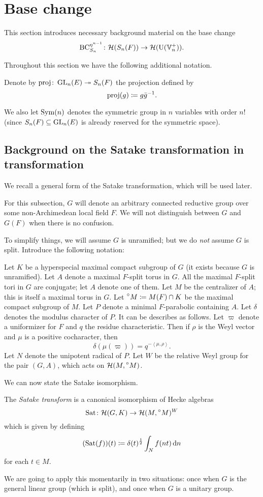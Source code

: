\chapter{Base change}
\label{ch:satake}

This section introduces necessary background material on the base change
\[ \operatorname{BC}_{S_n}^{\eta^{n-1}} \colon \mathcal H(S_n(F)) \to \mathcal H(\operatorname{U}(\mathbb V_n^+)). \]

Throughout this section we have the following additional notation.
\begin{definition}
  Denote by $\operatorname{proj} \colon \operatorname{GL}_n(E) \twoheadrightarrow S_n(F)$ the projection defined by
  \[ \operatorname{proj}(g) \coloneqq g \bar{g}^{-1}. \]
\end{definition}
We also let $\operatorname{Sym}(n)$ denotes the symmetric group in $n$ variables with order $n!$
(since $S_n(F) \subseteq \operatorname{GL}_n(E)$ is already reserved for the symmetric space).

\section{Background on the Satake transformation in transformation}
We recall a general form of the Satake transformation, which will be used later.

For this subsection, $G$ will denote an arbitrary connected reductive group
over some non-Archimedean local field $F$.
We will not distinguish between $G$ and $G(F)$ when there is no confusion.

To simplify things, we will assume $G$ is unramified;
but we do \emph{not} assume $G$ is split.
Introduce the following notation:
\begin{itemize}
  \ii Let $K$ be a hyperspecial maximal compact subgroup of $G$
  (it exists because $G$ is unramified).
  \ii Let $A$ denote a maximal $F$-split torus in $G$.
  All the maximal $F$-split tori in $G$ are conjugate; let $A$ denote one of them.
  \ii Let $M$ be the centralizer of $A$; this is itself a maximal torus in $G$.
  \ii Let $\prescript{\circ}{} M \coloneqq M(F) \cap K$
  be the maximal compact subgroup of $M$.
  \ii Let $P$ denote a minimal $F$-parabolic containing $A$.
  \ii Let $\delta$ denotes the modulus character of $P$.
  It can be describes as follows.
  Let $\varpi$ denote a uniformizer for $F$ and $q$ the residue characteristic.
  Then if $\rho$ is the Weyl vector and $\mu$ is a positive cocharacter, then
  \[ \delta(\mu(\varpi)) = q^{- \left< \mu, \rho\right>}. \]
  \ii Let $N$ denote the unipotent radical of $P$.
  \ii Let $W$ be the relative Weyl group for the pair $(G,A)$,
  which acts on $\mathcal H(M, \prescript{\circ}{} M)$.
\end{itemize}
We can now state the Satake isomorphism.
\begin{definition}
  The \emph{Satake transform} is a canonical isomorphism of Hecke algebras
  \[ \operatorname{Sat} \colon \mathcal H(G, K) \to \mathcal H(M, \prescript{\circ}{} M)^W \]
  which is given by defining
  \[ (\Sat(f))(t) \coloneqq \delta(t)^\half \int_N f(nt) \odif n  \]
  for each $t \in M$.
\end{definition}
We are going to apply this momentarily in two situations:
once when $G$ is the general linear group (which is split),
and once when $G$ is a unitary group.


